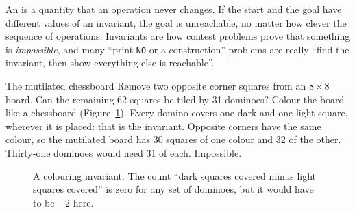 An  is a quantity that an operation never changes. If the start and the goal have different values of an
invariant, the goal is unreachable, no matter how clever the sequence of operations. Invariants are how contest problems
prove that something is \emph{impossible}, and many ``print \texttt{NO} or a construction'' problems are really ``find the
invariant, then show everything else is reachable''.

\begin{problem}{The mutilated chessboard}
Remove two opposite corner squares from an $8 \times 8$ board. Can the remaining 62 squares be tiled by 31 dominoes?
\solution Colour the board like a chessboard (Figure~\ref{fig:chessboard}). Every domino covers one dark and one light square,
wherever it is placed: that is the invariant. Opposite corners have the same colour, so the mutilated board has 30 squares of
one colour and 32 of the other. Thirty-one dominoes would need 31 of each. Impossible.
\end{problem}

\begin{figure}[htbp]
\centering
{}
\caption{A colouring invariant. The count ``dark squares covered minus light squares covered'' is zero for any set of
dominoes, but it would have to be $-2$ here.}
\label{fig:chessboard}
\end{figure}

